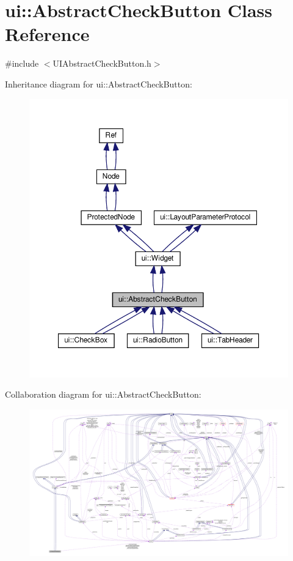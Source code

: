 \hypertarget{classui_1_1AbstractCheckButton}{}\section{ui\+:\+:Abstract\+Check\+Button Class Reference}
\label{classui_1_1AbstractCheckButton}


{\ttfamily \#include $<$U\+I\+Abstract\+Check\+Button.\+h$>$}



Inheritance diagram for ui\+:\+:Abstract\+Check\+Button\+:
\nopagebreak
\begin{figure}[H]
\begin{center}
\leavevmode
\includegraphics[width=350pt]{classui_1_1AbstractCheckButton__inherit__graph}
\end{center}
\end{figure}


Collaboration diagram for ui\+:\+:Abstract\+Check\+Button\+:
\nopagebreak
\begin{figure}[H]
\begin{center}
\leavevmode
\includegraphics[width=350pt]{classui_1_1AbstractCheckButton__coll__graph}
\end{center}
\end{figure}
